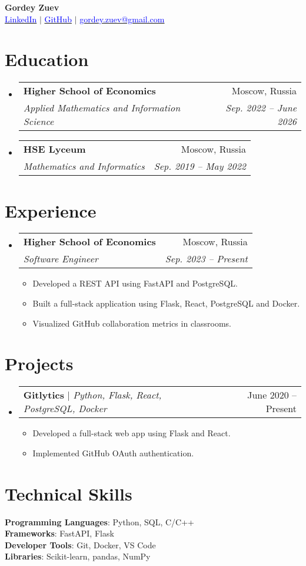 \documentclass[letterpaper,11pt]{article}
\makeatletter
\newcommand{\resumeItem}[1]{\item\small{#1 \vspace{-2pt}}}
\newcommand{\resumeSubheading}[4]{
  \vspace{-2pt}\item
    \begin{tabular*}{0.97\textwidth}[t]{l@{\extracolsep{\fill}}r}
      \textbf{#1} & #2 \\
      \textit{\small#3} & \textit{\small #4} \\
    \end{tabular*}\vspace{-7pt}
}
\newcommand{\resumeProjectHeading}[2]{
  \item
    \begin{tabular*}{0.97\textwidth}{l@{\extracolsep{\fill}}r}
      \small#1 & #2 \\
    \end{tabular*}\vspace{-7pt}
}
\newcommand{\resumeItemListStart}{\begin{itemize}}
\newcommand{\resumeItemListEnd}{\end{itemize}\vspace{-5pt}}
\newcommand{\resumeSubHeadingListStart}{\begin{itemize}[leftmargin=0.15in, label={}]}
\newcommand{\resumeSubHeadingListEnd}{\end{itemize}}
\makeatother
\begin{document}
\begin{center}
    \textbf{\Huge Gordey Zuev} \\ \vspace{1pt}
    \href{https://www.linkedin.com/in/gordey-zuev/}{\textcolor{blue}{LinkedIn}} $|$
    \href{https://github.com/GordeyZuev}{\textcolor{blue}{GitHub}} $|$
    \href{mailto:gordey.zuev@gmail.com}{\textcolor{blue}{gordey.zuev@gmail.com}}
\end{center}

\section{Education}
\resumeSubHeadingListStart
  \resumeSubheading
    {Higher School of Economics}{Moscow, Russia}
    {Applied Mathematics and Information Science}{Sep. 2022 -- June 2026}
  \resumeSubheading
    {HSE Lyceum}{Moscow, Russia}
    {Mathematics and Informatics}{Sep. 2019 -- May 2022}
\resumeSubHeadingListEnd

\section{Experience}
\resumeSubHeadingListStart
  \resumeSubheading
    {Higher School of Economics}{Moscow, Russia}
    {Software Engineer}{Sep. 2023 -- Present}
  \resumeItemListStart
    \resumeItem{Developed a REST API using FastAPI and PostgreSQL.}
    \resumeItem{Built a full-stack application using Flask, React, PostgreSQL and Docker.}
    \resumeItem{Visualized GitHub collaboration metrics in classrooms.}
  \resumeItemListEnd
\resumeSubHeadingListEnd

\section{Projects}
\resumeSubHeadingListStart
  \resumeProjectHeading
      {\textbf{Gitlytics} $|$ \emph{Python, Flask, React, PostgreSQL, Docker}}{June 2020 -- Present}
  \resumeItemListStart
    \resumeItem{Developed a full-stack web app using Flask and React.}
    \resumeItem{Implemented GitHub OAuth authentication.}
  \resumeItemListEnd
\resumeSubHeadingListEnd

\section{Technical Skills}
\begin{itemize}[leftmargin=0.15in, label={}]
  \small{
    \item{
      \textbf{Programming Languages}{: Python, SQL, C/C++} \\
      \textbf{Frameworks}{: FastAPI, Flask} \\
      \textbf{Developer Tools}{: Git, Docker, VS Code} \\
      \textbf{Libraries}{: Scikit-learn, pandas, NumPy}
    }
  }
\end{itemize}

\end{document}

